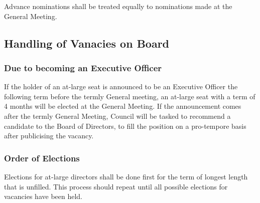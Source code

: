 \noindent Advance nominations shall be treated equally to nominations made at the General Meeting. 

\subsection{Handling of Vanacies on Board}
\subsubsection{Due to becoming an Executive Officer}
If the holder of an at-large seat is announced to be an Executive Officer the following term before the termly General meeting, an at-large seat with a term of 4 months will be elected at the General Meeting. 
If the announcement comes after the termly General Meeting, Council will be tasked to recommend a candidate to the Board of Directors, to fill the position on a pro-tempore basis after publicising the vacancy.

\subsubsection{Order of Elections}
Elections for at-large directors shall be done first for the term of longest length that is unfilled. 
This process should repeat until all possible elections for vacancies have been held. 

